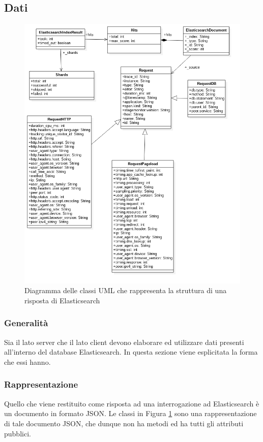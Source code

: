 \subsection{Dati}


\begin{figure}[H]
    \centering
    \includegraphics[width=1\textwidth]{Images/classiDati.png}
    \caption{Diagramma delle classi UML che rappresenta la struttura di una risposta di Elasticsearch}
    \label{img:dati}
\end{figure}

\subsubsection{Generalità}
Sia il lato server che il lato client devono elaborare ed utilizzare dati presenti all'interno del database Elasticsearch. In questa sezione viene esplicitata la forma che essi hanno.

\subsubsection{Rappresentazione}
Quello che viene restituito come risposta ad una interrogazione ad Elasticsearch è un documento in formato JSON. Le classi in Figura \ref{img:dati} sono una rappresentazione di tale documento JSON, che dunque non ha metodi ed ha tutti gli attributi pubblici.

